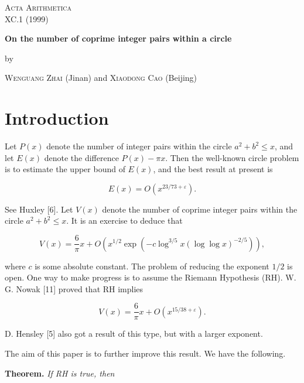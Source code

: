 \documentclass[10pt]{article}
\begin{document}
\begin{center}
  \textsc{Acta Arithmetica}\\
  XC.1 (1999)

  \vspace{2.5cm}
  {\Large\bfseries On the number of coprime integer pairs within a circle\par}
  \vspace{1em}
  by
  \vspace{0.5em}

  \textsc{Wenguang Zhai} (Jinan) and \textsc{Xiaodong Cao} (Beijing)
\end{center}

\section{Introduction}
Let $P(x)$ denote the number of integer pairs within the circle
$a^{2}+b^{2} \leq x$, and let $E(x)$ denote the difference $P(x)-\pi x$.
Then the well-known circle problem is to estimate the upper bound of $E(x)$,
and the best result at present is

\begin{equation*}
E(x)=O\left(x^{23/73+\varepsilon}\right). \tag{1.1}
\end{equation*}

See Huxley [6].
Let $V(x)$ denote the number of coprime integer pairs within the circle
$a^{2}+b^{2} \leq x$. It is an exercise to deduce that

\begin{equation*}
V(x)=\frac{6}{\pi}x
 +O\left(x^{1/2}\exp\left(-c\log^{3/5}x(\log\log x)^{-2/5}\right)\right), \tag{1.2}
\end{equation*}

where $c$ is some absolute constant. The problem of reducing the exponent
$1/2$ is open. One way to make progress is to assume the Riemann Hypothesis
(RH). W. G. Nowak [11] proved that RH implies

\begin{equation*}
V(x)=\frac{6}{\pi}x+O\left(x^{15/38+\varepsilon}\right). \tag{1.3}
\end{equation*}

D. Hensley [5] also got a result of this type, but with a larger exponent.

The aim of this paper is to further improve this result. We have the following.

\medskip
\noindent\textbf{Theorem.} \textit{If RH is true, then}
\end{document}
